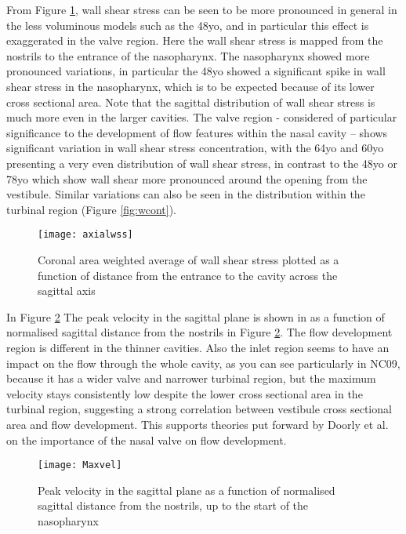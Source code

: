 From Figure \ref{fig:wax}, wall shear stress can be seen to be more pronounced in general in the less voluminous models such as the 48yo, and in particular this effect is exaggerated in the valve region. Here the wall shear stress is mapped from the nostrils to the entrance of the nasopharynx. The nasopharynx showed more pronounced variations, in particular the 48yo showed a significant spike in wall shear stress in the nasopharynx, which is to be expected because of its lower cross sectional area. Note that the sagittal distribution of wall shear stress is much more even in the larger cavities.  The valve region - considered of particular significance to the development of flow features within the nasal cavity \cite{Lindemann2008} – shows significant variation in wall shear stress concentration, with the 64yo and 60yo presenting a very even distribution of wall shear stress, in contrast to the 48yo or 78yo which show wall shear more pronounced around the opening from the vestibule. Similar variations can also be seen in the distribution within the turbinal region (Figure \ref{fig:wcont}). 

\begin{figure} 
  \texttt{[image: axialwss]}
  \caption{Coronal area weighted average of wall shear stress plotted as a function of distance from the entrance to the cavity across the sagittal axis}
  \label{fig:wax}
\end{figure}

In Figure \ref{fig:peakvel} The peak velocity in the sagittal plane is shown in as a function of normalised sagittal distance from the nostrils in Figure \ref{fig:peakvel}. The flow development region is different in the thinner cavities. Also the inlet region seems to have an impact on the flow through the whole cavity, as you can see particularly in NC09, because it has a wider valve and narrower turbinal region, but the maximum velocity stays consistently low despite the lower cross sectional area in the turbinal region, suggesting a strong correlation between vestibule cross sectional area and flow development. This supports theories put forward by Doorly et al. \cite{Doorly2008c} on the importance of the nasal valve on flow development.

\begin{figure} 
  \texttt{[image: Maxvel]}
  \caption{Peak velocity in the sagittal plane as a function of normalised sagittal distance from the nostrils, up to the start of the nasopharynx}
  \label{fig:peakvel}
\end{figure}

